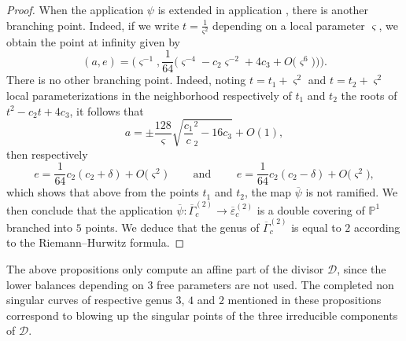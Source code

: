 \documentclass[10pt,a4paper]{amsart}
\numberwithin{equation}{section}
\begin{document}
\begin{proof}
 When the application $\psi$ is extended in application
 , there is another branching point. Indeed, if we write $t=\frac{1}{\varsigma^2}$ depending on a local parameter $\varsigma$, we obtain the point at infinity  given by
 \[(a,e)=\biggl(\varsigma^{-1},\frac{1}{64}\bigl(\varsigma^{-4}-
 c_2\varsigma^{-2}+4c_3+O\bigl(\varsigma^6\bigr)\bigr)\biggr).\]
 There is no other branching point. Indeed, noting
 $t=t_1+\varsigma^2$ and $t=t_2+\varsigma^2$ local parameterizations in the neighborhood respectively of $t_1$ and $t_2$ the roots of $t^2-c_2t+4c_3$, it follows that
 \[a=\pm\frac{128}{\varsigma}\sqrt{\frac{c_1} c_2^2-16c_3}+O (1 ),\] then respectively
 \[e=\frac{1}{64}c_2 (c_2+\delta )+O \bigl(\varsigma^2 \bigr) \qquad \text{ and } \qquad
 e= \frac{1}{64}c_2 (c_2-\delta )+O \bigl(\varsigma^2 \bigr),
 \] which shows that above from the points $t_1$ and $t_2$, the map $\overline{\psi}$ is not ramified. We then conclude that the application $\overline{\psi}\colon \overline{\Gamma}_c^{(2)} \longrightarrow
 \overline{\varepsilon}_c^{(2)}$ is a double covering of $\mathbb{P}^1$ branched into $5$ points. We deduce that the genus of $\overline{\Gamma}_c^{(2)}$ is equal to $2$ according to the Riemann--Hurwitz formula.
 \end{proof}

\begin{Remark}
The above propositions only compute an affine part of the divisor
$\mathcal{D}$, since the lower balances depending on $3$ free
parameters are not used. The completed non singular curves of
respective genus $3$, $4$ and $2$ mentioned in these propositions
correspond to blowing up the singular points of the three
irreducible components of $\mathcal{D}$.
\end{Remark}
\end{document}
